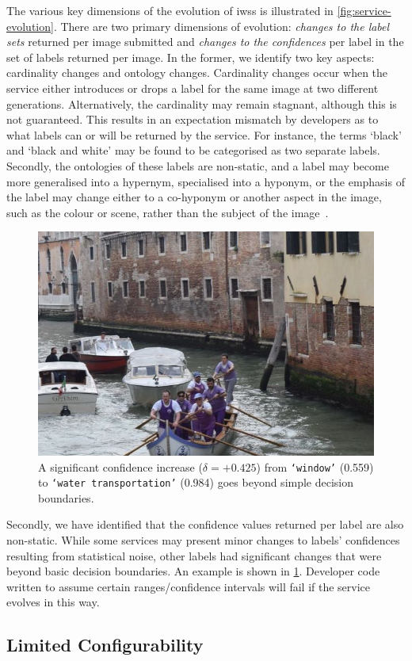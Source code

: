 The various key dimensions of the evolution of \glspl{iws} is illustrated in \cref{fig:service-evolution}. There are two primary dimensions of evolution: \textit{changes to the label sets} returned per image submitted and \textit{changes to the confidences} per label in the set of labels returned per image. In the former, we identify two key aspects: cardinality changes and ontology changes. Cardinality changes occur when the service either introduces or drops a label for the same image at two different generations. Alternatively, the cardinality may remain stagnant, although this is not guaranteed. This results in an expectation mismatch by developers as to what labels can or will be returned by the service. For instance, the terms `black' and `black and white' may be found to be categorised as two separate labels. Secondly, the ontologies of these labels are non-static, and a label may become more generalised into a hypernym, specialised into a hyponym, or the emphasis of the label may change either to a co-hyponym or another aspect in the image, such as the colour or scene, rather than the subject of the image~\citep{Cummaudo:2019icsme}.

\begin{figure}
    \centering
    \includegraphics[width=0.4\linewidth]{large-delta}
    \caption{A significant confidence increase ($\delta = +0.425$) from \texttt{`window'} (0.559) to \texttt{`water transportation'} (0.984) goes beyond simple decision boundaries.}
    \label{fig:large-delta}
\end{figure}

Secondly, we have identified that the confidence values returned per label are also non-static. While some services may present minor changes to labels' confidences resulting from statistical noise, other labels had significant changes that were beyond basic decision boundaries. An example is shown in \cref{fig:large-delta}. Developer code written to assume certain ranges/confidence intervals will fail if the service evolves in this way.

\subsection{Limited Configurability}


